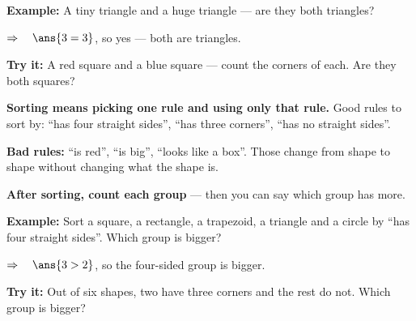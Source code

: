 \documentclass[12pt]{article}
\begin{document}
\begin{examplebox}
\textbf{Example:} \quad A tiny triangle and a huge triangle --- are they both triangles?

$\Rightarrow\quad \ans{3 = 3}$, so yes --- both are triangles.
\end{examplebox}

\begin{tryitbox}
\textbf{Try it:} \quad A red square and a blue square --- count the corners of each. Are they both squares?\\[2pt]
\end{tryitbox}


\begin{formulabox}
\textbf{Sorting means picking one rule and using only that rule.} Good rules to sort by: ``has four straight sides'', ``has three corners'', ``has no straight sides''.\par
\textbf{Bad rules:} ``is red'', ``is big'', ``looks like a box''. Those change from shape to shape without changing what the shape is.\par
\textbf{After sorting, count each group} --- then you can say which group has more.
\end{formulabox}

\begin{examplebox}
\textbf{Example:} \quad Sort a square, a rectangle, a trapezoid, a triangle and a circle by ``has four straight sides''. Which group is bigger?

$\Rightarrow\quad \ans{3 > 2}$, so the four-sided group is bigger.
\end{examplebox}

\begin{tryitbox}
\textbf{Try it:} \quad Out of six shapes, two have three corners and the rest do not. Which group is bigger?\\[2pt]
\end{tryitbox}
\end{document}
